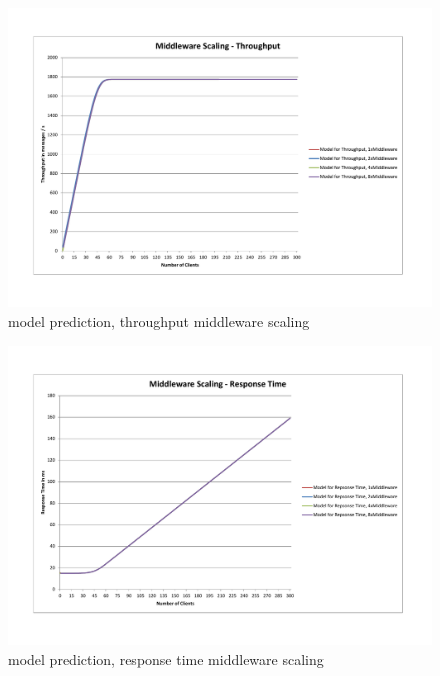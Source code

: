 \documentclass[a4paper]{article}
\begin{document}
\begin{landscape}\begin{figure}[H]
	\begin{center}
    \includegraphics[scale=0.7, trim = 23mm 28mm 24mm 24mm, clip]{measurements_increase_load/tp_middleware_scaling.pdf}
  \end{center}
  \caption{model prediction, throughput middleware scaling}
  \label{fig:tp-middleware-scale}
\end{figure}

\begin{figure}[H]
	\begin{center}
    \includegraphics[scale=0.7, trim = 23mm 28mm 24mm 24mm, clip]{measurements_increase_load/rt_middleware_scaling.pdf}
  \end{center}
  \caption{model prediction, response time middleware scaling}
  \label{fig:rt-middleware-scale}
\end{figure}

\end{landscape}
\end{document}
